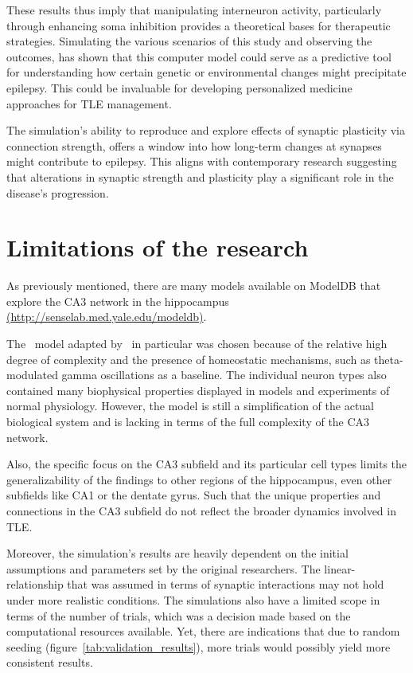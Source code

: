 These results thus imply that manipulating interneuron activity, particularly through enhancing soma inhibition provides a theoretical bases for therapeutic strategies.
Simulating the various scenarios of this study and observing the outcomes, has shown that this computer model could serve as a predictive tool for understanding how certain genetic
or environmental changes might precipitate epilepsy. This could be invaluable for developing personalized medicine approaches for TLE management.

The simulation's ability to reproduce and explore effects of synaptic plasticity via connection strength, offers a window into how long-term changes
at synapses might contribute to epilepsy. This aligns with contemporary research suggesting that alterations in synaptic strength and
plasticity play a significant role in the disease's progression.

\section{Limitations of the research}
As previously mentioned, there are many models available on ModelDB that explore the CA3 network in the hippocampus
\href{http://senselab.med.yale.edu/modeldb}{(\url{http://senselab.med.yale.edu/modeldb})}.

The~\textcite{neymotinKetamineDisruptsTheta2011} model adapted by~\textcite{sanjayImpairedDendriticInhibition2015} in particular was chosen
because of the relative high degree of complexity and the presence of homeostatic mechanisms, such as theta-modulated gamma oscillations
as a baseline. The individual neuron types also contained many biophysical properties displayed in models and experiments of normal physiology.
However, the model is still a simplification of the actual biological system and is lacking in terms of the full complexity of the CA3 network.

Also, the specific focus on the CA3 subfield and its particular cell types limits the generalizability of the findings to other regions of the hippocampus,
even other subfields like CA1 or the dentate gyrus. Such that the unique properties and connections in the CA3 subfield do not
reflect the broader dynamics involved in TLE\@.

Moreover, the simulation's results are heavily dependent on the initial assumptions and parameters set by the original researchers.
The linear-relationship that was assumed in terms of synaptic interactions may not hold under more realistic conditions.
The simulations also have a limited scope in terms of the number of trials, which was a decision made based on the computational resources available.
Yet, there are indications that due to random seeding (figure~\ref{tab:validation_results}), more trials would possibly yield more consistent results.

